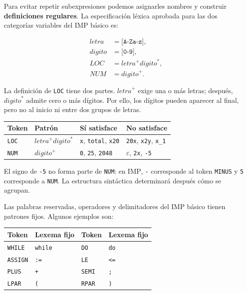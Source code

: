 \documentclass[11pt,spanish]{article}
\providecommand{\tabularnewline}{\\}
\begin{document}
Para evitar repetir subexpresiones podemos asignarles nombres y construir \textbf{definiciones regulares}. La especificación léxica aprobada para las dos categorías variables del \textsc{IMP} básico es:

\[
\begin{aligned}
\mathit{letra}  & = \texttt{[A-Za-z]},\\
\mathit{digito} & = \texttt{[0-9]},\\
\mathit{LOC}    & = \mathit{letra}^{+}\mathit{digito}^{*},\\
\mathit{NUM}    & = \mathit{digito}^{+}.
\end{aligned}
\]

La definición de \texttt{LOC} tiene dos partes. \(\mathit{letra}^{+}\) exige una o más letras; después, \(\mathit{digito}^{*}\) admite cero o más dígitos. Por ello, los dígitos pueden aparecer al final, pero no al inicio ni entre dos grupos de letras.

\begin{center}
\renewcommand{\arraystretch}{1.25}
\begin{tabular}{|p{}|p{}|p{}|p{}|}
\hline
\textbf{Token} & \textbf{Patrón} & \textbf{Sí satisface} & \textbf{No satisface} \tabularnewline
\hline
\texttt{LOC} & \(\mathit{letra}^{+}\mathit{digito}^{*}\) & \texttt{x}, \texttt{total}, \texttt{x20} & \texttt{20x}, \texttt{x2y}, \texttt{x\_1} \tabularnewline
\hline
\texttt{NUM} & \(\mathit{digito}^{+}\) & \texttt{0}, \texttt{25}, \texttt{2048} & \(\varepsilon\), \texttt{2x}, \texttt{-5} \tabularnewline
\hline
\end{tabular}
\end{center}

El signo de \texttt{-5} no forma parte de \texttt{NUM}: en \textsc{IMP}, \texttt{-} corresponde al token \texttt{MINUS} y \texttt{5} corresponde a \texttt{NUM}. La estructura sintáctica determinará después cómo se agrupan.

Las palabras reservadas, operadores y delimitadores del \textsc{IMP} básico tienen patrones fijos. Algunos ejemplos son:

\begin{center}
\renewcommand{\arraystretch}{1.2}
\begin{tabular}{|p{}|p{}||p{}|p{}|}
\hline
\textbf{Token} & \textbf{Lexema fijo} & \textbf{Token} & \textbf{Lexema fijo} \tabularnewline
\hline
\texttt{WHILE} & \texttt{while} & \texttt{DO} & \texttt{do} \tabularnewline
\hline
\texttt{ASSIGN} & \texttt{:=} & \texttt{LE} & \texttt{<=} \tabularnewline
\hline
\texttt{PLUS} & \texttt{+} & \texttt{SEMI} & \texttt{;} \tabularnewline
\hline
\texttt{LPAR} & \texttt{(} & \texttt{RPAR} & \texttt{)} \tabularnewline
\hline
\end{tabular}
\end{center}
\end{document}

